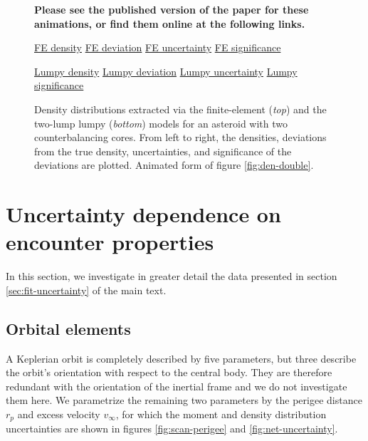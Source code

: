 \begin{figure}
  \textbf{Please see the published version of the paper for these animations, or find them online at the following links.}

  \href{https://github.com/jack-dinsmore/asteroid-tidal-torque/tree/main/paper/gifs/double-fe-d.mp4}{FE density} \hfill
  \href{https://github.com/jack-dinsmore/asteroid-tidal-torque/tree/main/paper/gifs/double-fe-s.mp4}{FE deviation} \hfill
  \href{https://github.com/jack-dinsmore/asteroid-tidal-torque/tree/main/paper/gifs/double-fe-u.mp4}{FE uncertainty} \hfill
  \href{https://github.com/jack-dinsmore/asteroid-tidal-torque/tree/main/paper/gifs/double-fe-r.mp4}{FE significance}

  \href{https://github.com/jack-dinsmore/asteroid-tidal-torque/tree/main/paper/gifs/double-l-d.mp4}{Lumpy density} \hfill
  \href{https://github.com/jack-dinsmore/asteroid-tidal-torque/tree/main/paper/gifs/double-l-s.mp4}{Lumpy deviation} \hfill
  \href{https://github.com/jack-dinsmore/asteroid-tidal-torque/tree/main/paper/gifs/double-l-u.mp4}{Lumpy uncertainty} \hfill
  \href{https://github.com/jack-dinsmore/asteroid-tidal-torque/tree/main/paper/gifs/double-l-r.mp4}{Lumpy significance}

  \caption{Density distributions extracted via the finite-element (\textit{top}) and the two-lump lumpy (\textit{bottom}) models for an asteroid with two counterbalancing cores. From left to right, the densities, deviations from the true density, uncertainties, and significance of the deviations are plotted. Animated form of figure \ref{fig:den-double}.}
  \label{fig:animated-double}
\end{figure}





\section{Uncertainty dependence on encounter properties}
\label{app:uncertainty-dependence}

In this section, we investigate in greater detail the data presented in section \ref{sec:fit-uncertainty} of the main text.

\subsection{Orbital elements}
\label{sec:scan-orbit}
A Keplerian orbit is completely described by five parameters, but three describe the orbit's orientation with respect to the central body. They are therefore redundant with the orientation of the inertial frame and we do not investigate them here. We parametrize the remaining two parameters by the perigee distance $r_p$ and excess velocity $v_\infty$, for which the moment and density distribution uncertainties are shown in figures \ref{fig:scan-perigee} and \ref{fig:net-uncertainty}.

